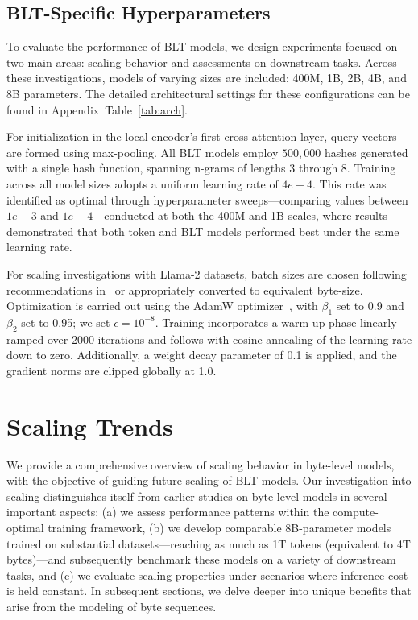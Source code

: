 \subsection{{\textsc BLT}-Specific Hyperparameters} 

To evaluate the performance of {\textsc BLT} models, we design experiments focused on two main areas: scaling behavior and assessments on downstream tasks. Across these investigations, models of varying sizes are included: 400M, 1B, 2B, 4B, and 8B parameters. The detailed architectural settings for these configurations can be found in Appendix~Table~\ref{tab:arch}.

For initialization in the local encoder’s first cross-attention layer, query vectors are formed using max-pooling. All {\textsc BLT} models employ $500,000$ hashes generated with a single hash function, spanning n-grams of lengths 3 through 8. Training across all model sizes adopts a uniform learning rate of $4e-4$. This rate was identified as optimal through hyperparameter sweeps—comparing values between $1e-3$ and $1e-4$—conducted at both the 400M and 1B scales, where results demonstrated that both token and {\textsc BLT} models performed best under the same learning rate.

For scaling investigations with Llama-2 datasets, batch sizes are chosen following recommendations in~\cite{dubey2024llama} or appropriately converted to equivalent byte-size. Optimization is carried out using the AdamW optimizer~\citep{adamw}, with $\beta_1$ set to 0.9 and $\beta_2$ set to 0.95; we set $\epsilon=10^{-8}$. Training incorporates a warm-up phase linearly ramped over 2000 iterations and follows with cosine annealing of the learning rate down to zero. Additionally, a weight decay parameter of 0.1 is applied, and the gradient norms are clipped globally at 1.0.

\section{Scaling Trends}
\label{section:scaling}

We provide a comprehensive overview of scaling behavior in byte-level models, with the objective of guiding future scaling of {\textsc BLT} models. Our investigation into scaling distinguishes itself from earlier studies on byte-level models in several important aspects: (a) we assess performance patterns within the compute-optimal training framework, (b) we develop comparable 8B-parameter models trained on substantial datasets—reaching as much as 1T tokens (equivalent to 4T bytes)—and subsequently benchmark these models on a variety of downstream tasks, and (c) we evaluate scaling properties under scenarios where inference cost is held constant. In subsequent sections, we delve deeper into unique benefits that arise from the modeling of byte sequences.

